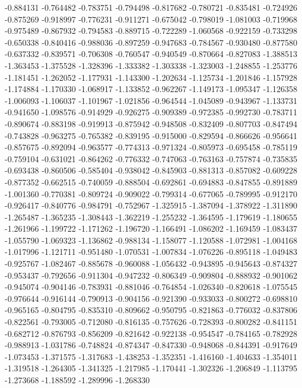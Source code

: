 -0.884131
-0.764482
-0.783751
-0.794498
-0.817682
-0.780721
-0.835481
-0.724926
-0.875269
-0.918997
-0.776231
-0.911271
-0.675042
-0.798019
-1.081003
-0.719968
-0.975489
-0.867932
-0.794583
-0.889715
-0.722289
-1.060568
-0.922159
-0.733298
-0.650338
-0.840416
-0.988036
-0.897259
-0.947683
-0.784567
-0.930480
-0.877580
-0.637332
-0.839571
-0.706308
-0.760547
-0.940549
-0.870664
-0.827083
-1.388513
-1.363453
-1.375528
-1.328396
-1.333382
-1.303338
-1.323003
-1.248855
-1.253776
-1.181451
-1.262052
-1.177931
-1.143300
-1.202634
-1.125734
-1.201846
-1.157928
-1.174884
-1.170330
-1.068917
-1.133852
-0.962267
-1.149173
-1.095347
-1.126358
-1.006093
-1.106037
-1.101967
-1.021856
-0.964544
-1.045089
-0.943967
-1.133731
-0.941650
-1.098576
-0.914929
-0.926275
-0.909389
-0.972385
-0.992730
-0.783711
-0.890674
-0.883198
-0.919913
-0.875942
-0.948508
-0.832409
-0.807703
-0.847494
-0.743828
-0.963275
-0.765382
-0.839195
-0.915000
-0.829594
-0.866626
-0.956641
-0.857675
-0.892094
-0.963577
-0.774313
-0.971324
-0.805973
-0.695458
-0.785119
-0.759104
-0.631021
-0.864262
-0.776332
-0.747063
-0.763163
-0.757874
-0.735835
-0.693438
-0.860506
-0.585404
-0.938042
-0.845903
-0.881313
-0.857082
-0.609228
-0.877352
-0.662515
-0.740059
-0.888504
-0.692861
-0.694883
-0.847855
-0.891889
-1.001360
-0.770381
-0.809724
-0.909022
-0.799314
-0.677065
-0.789995
-0.912170
-0.926417
-0.840776
-0.984791
-0.752967
-1.325915
-1.387094
-1.378922
-1.311890
-1.265487
-1.365235
-1.308443
-1.362219
-1.255232
-1.364595
-1.179619
-1.180655
-1.261966
-1.199722
-1.171262
-1.196720
-1.166491
-1.086202
-1.169459
-1.083437
-1.055790
-1.069323
-1.136862
-0.988134
-1.158077
-1.120588
-1.072981
-1.004168
-1.017996
-1.121711
-0.951480
-1.070531
-1.007834
-1.076226
-0.895118
-1.049483
-0.925767
-1.082467
-0.885678
-0.960088
-1.056432
-0.943895
-0.945643
-0.874327
-0.953437
-0.792656
-0.911304
-0.947232
-0.806349
-0.909804
-0.888932
-0.901062
-0.945074
-0.904146
-0.783931
-0.881046
-0.764854
-1.026340
-0.820618
-1.075545
-0.976644
-0.916144
-0.790913
-0.904156
-0.921390
-0.933033
-0.800272
-0.698810
-0.965165
-0.804795
-0.835310
-0.809662
-0.950795
-0.821863
-0.776032
-0.837806
-0.822561
-0.793005
-0.712080
-0.816135
-0.757626
-0.728393
-0.800282
-0.841151
-0.682712
-0.876793
-0.856209
-0.821642
-0.922138
-0.954547
-0.784165
-0.782928
-0.988913
-1.031786
-0.748824
-0.874347
-0.847330
-0.948068
-0.844391
-0.917649
-1.073453
-1.371575
-1.317683
-1.438253
-1.352351
-1.416160
-1.404633
-1.354011
-1.319518
-1.264305
-1.341325
-1.217985
-1.170441
-1.302326
-1.206849
-1.113795
-1.273668
-1.188592
-1.289996
-1.268330
